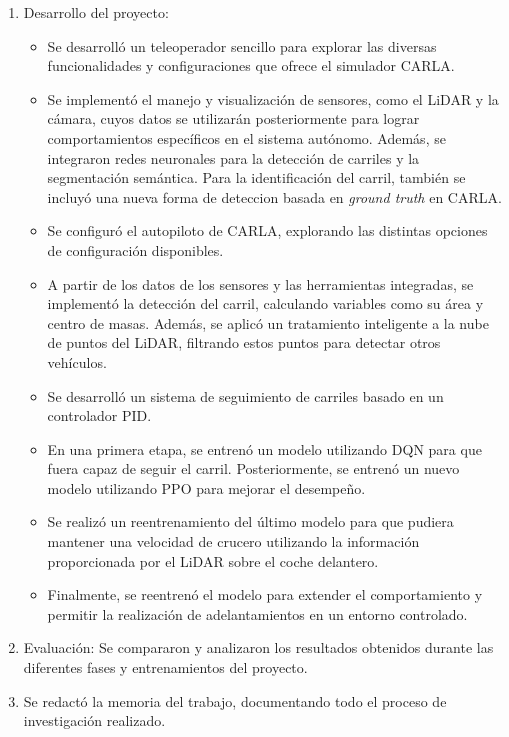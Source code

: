 \begin{enumerate}
    \item Desarrollo del proyecto:
	\begin{itemize}
		\item Se desarrolló un teleoperador sencillo para explorar las diversas funcionalidades y configuraciones que ofrece el simulador CARLA.
		\item Se implementó el manejo y visualización de sensores, como el \ac{LiDAR} y la cámara, cuyos datos se utilizarán posteriormente para lograr comportamientos específicos en el sistema autónomo. Además, se integraron redes neuronales para la detección de carriles y la segmentación semántica. Para la identificación del carril, también se incluyó una nueva forma de deteccion basada en \textit{ground truth} en CARLA.	
		\item Se configuró el autopiloto de CARLA, explorando las distintas opciones de configuración disponibles.
		\item A partir de los datos de los sensores y las herramientas integradas, se implementó la detección del carril, calculando variables como su área y centro de masas. Además, se aplicó un tratamiento inteligente a la nube de puntos del \ac{LiDAR}, filtrando estos puntos para detectar otros vehículos.
		\item Se desarrolló un sistema de seguimiento de carriles basado en un controlador \ac{PID}.
		\item En una primera etapa, se entrenó un modelo utilizando \ac{DQN} para que fuera capaz de seguir el carril. Posteriormente, se entrenó un nuevo modelo utilizando \ac{PPO} para mejorar el desempeño.
		\item Se realizó un reentrenamiento del último modelo para que pudiera mantener una velocidad de crucero utilizando la información proporcionada por el \ac{LiDAR} sobre el coche delantero.
		\item Finalmente, se reentrenó el modelo para extender el comportamiento y permitir la realización de adelantamientos en un entorno controlado.
	\end{itemize}

    \item Evaluación: Se compararon y analizaron los resultados obtenidos durante las diferentes fases y entrenamientos del proyecto.
    \item Se redactó la memoria del trabajo, documentando todo el proceso de investigación realizado.
\end{enumerate}

